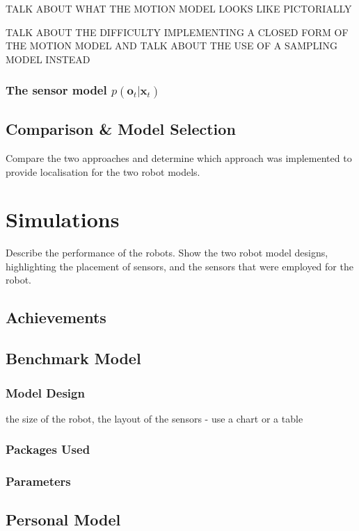 \documentclass[a4paper]{article}
\begin{document}
TALK ABOUT WHAT THE MOTION MODEL LOOKS LIKE PICTORIALLY

TALK ABOUT THE DIFFICULTY IMPLEMENTING A CLOSED FORM OF THE MOTION MODEL AND TALK ABOUT THE USE OF A SAMPLING MODEL INSTEAD

\subsubsection{The sensor model $p(\mathbf{o}_t|\mathbf{x}_t)$}


\subsection{Comparison \& Model Selection}
Compare the two approaches and determine which approach was implemented to provide localisation for the two robot models.

\section{Simulations}
Describe the performance of the robots. Show the two robot model designs, highlighting the placement of sensors, and the sensors that were employed for the robot.

\subsection{Achievements}

\subsection{Benchmark Model}
\subsubsection{Model Design}
the size of the robot, the layout of the sensors - use a chart or a table

\subsubsection{Packages Used}


\subsubsection{Parameters}

\subsection{Personal Model}
\end{document}
